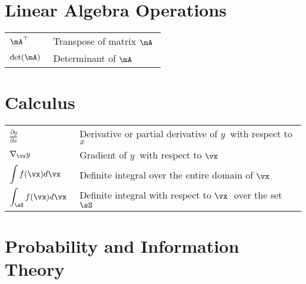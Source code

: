 \section*{Linear Algebra Operations}
\bgroup{}
\begin{tabular}{>{\centering}p{1.2in}p{4in}}
  \(\displaystyle \mA^\top~\) & Transpose of matrix  \(\mA~\) \\
  \(\displaystyle \mathrm{\text{det}}(\mA)~\) & Determinant of  \(\mA~\) \\
\end{tabular}
\egroup{}

\section*{Calculus}
\bgroup{}
\begin{tabular}{>{\centering}p{1.2in}p{4in}}
  \(\displaystyle  \frac{\partial y} {\partial x} ~\) & Derivative or partial derivative of \(y~\) with respect to \(x~\) \\
  \(\displaystyle  \nabla_\vx y ~\) & Gradient of \(y~\) with respect to  \(\vx~\) \\
  \(\displaystyle  \int f(\vx) d\vx ~\) & Definite integral over the entire domain of  \(\vx~\) \\
  \(\displaystyle  \int_\sS f(\vx) d\vx~\) & Definite integral with respect to  \(\vx~\) over the set  \(\sS~\) \\
\end{tabular}
\egroup{}

\section*{Probability and Information Theory}

